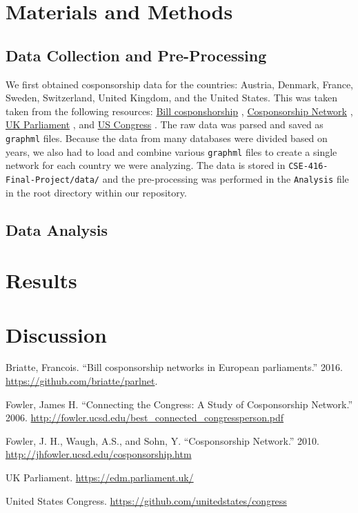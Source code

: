 \documentclass[12pt]{article}
\begin{document}
\section{Materials and Methods}

\subsection{Data Collection and Pre-Processing}
We first obtained cosponsorship data for the countries: Austria, Denmark, France, Sweden, Switzerland, United Kingdom, and the United States. This was taken taken from the following resources: \underline{Bill cosponshorship} \cite{briatte}, \underline{Cosponsorship Network} \cite{fowler}, \underline{UK Parliament} \cite{UK}, and \underline{US Congress} \cite{US}. The raw data was parsed and saved as \texttt{graphml} files. Because the data from many databases were divided based on years, we also had to load and combine various \texttt{graphml} files to create a single network for each country we were analyzing. The data is stored in \texttt{CSE-416-Final-Project/data/} and the pre-processing was performed in the \texttt{Analysis} file in the root directory within our repository.

\subsection{Data Analysis}


\section{Results}

\section{Discussion}

\newpage
\begin{thebibliography}{9}

 Briatte, Francois. ``Bill cosponsorship networks in European parliaments.'' 2016. \url{https://github.com/briatte/parlnet}.

 Fowler, James H. ``Connecting the Congress: A Study of Cosponsorship Network.'' 2006. \url{http://fowler.ucsd.edu/best_connected_congressperson.pdf}

 Fowler, J. H., Waugh, A.S., and Sohn, Y. ``Cosponsorship Network.'' 2010. \url {http://jhfowler.ucsd.edu/cosponsorship.htm}

 UK Parliament. \url{https://edm.parliament.uk/}

 United States Congress. \url{https://github.com/unitedstates/congress}
\end{thebibliography}
\end{document}
